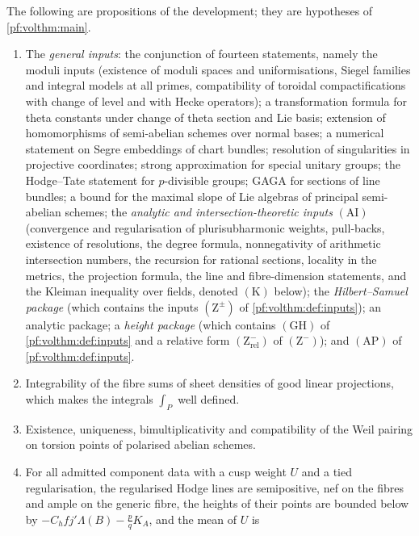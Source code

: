 \begin{definition}\label{pf:volthm:def:Hinputs}
The following are propositions of the development; they are hypotheses of \cref{pf:volthm:main}.
\begin{enumerate}[label=(\roman*)]
\item[$(\mathrm{H}_0)$] The \emph{general inputs}: the conjunction of fourteen statements, namely the moduli
  inputs (existence of moduli spaces and uniformisations, Siegel families and integral models at all primes,
  compatibility of toroidal compactifications with change of level and with Hecke operators); a
  transformation formula for theta constants under change of theta section and Lie basis; extension of
  homomorphisms of semi-abelian schemes over normal bases; a numerical statement on Segre embeddings of chart
  bundles; resolution of singularities in projective coordinates; strong approximation for special unitary
  groups; the Hodge--Tate statement for $p$-divisible groups; GAGA for sections of line bundles; a bound for
  the maximal slope of Lie algebras of principal semi-abelian schemes; the \emph{analytic and
  intersection-theoretic inputs} $(\mathrm{AI})$ (convergence and regularisation of plurisubharmonic weights,
  pull-backs, existence of resolutions, the degree formula, nonnegativity of arithmetic intersection numbers,
  the recursion for rational sections, locality in the metrics, the projection formula, the line and
  fibre-dimension statements, and the Kleiman inequality over fields, denoted $(\mathrm{K})$ below); the
  \emph{Hilbert--Samuel package} (which contains the inputs $(\mathrm{Z}^\pm)$ of \cref{pf:volthm:def:inputs}); an
  analytic package; a \emph{height package} (which contains $(\mathrm{GH})$ of \cref{pf:volthm:def:inputs} and a
  relative form $(\mathrm{Z}^-_{\mathrm{rel}})$ of $(\mathrm{Z}^-)$); and $(\mathrm{AP})$ of
  \cref{pf:volthm:def:inputs}.
\item[$(\mathrm{H}_1)$] Integrability of the fibre sums of sheet densities of good linear projections, which makes
  the integrals $\int_P$ well defined.
\item[$(\mathrm{H}_2)$] Existence, uniqueness, bimultiplicativity and compatibility of the Weil pairing on torsion
  points of polarised abelian schemes.
\item[$(\mathrm{H}_3)_{C_h,C_u}$] For all admitted component data with a cusp weight $U$ and a tied
  regularisation, the regularised Hodge lines are semipositive, nef on the fibres and ample on the generic
  fibre, the heights of their points are bounded below by $-C_hfj'\Lambda(B)-\frac pqK_A$, and the mean of $U$ is

\end{enumerate}
\end{definition}
